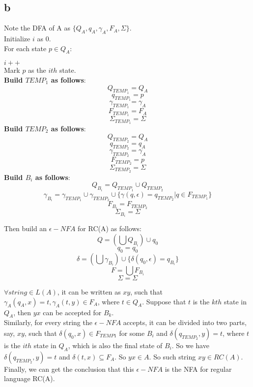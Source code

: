 \documentclass{ctexart}
\begin{document}
\subsection{b}
Note the DFA of A as $\{Q_A, q_A, \gamma_A, F_A, \Sigma\}$.\\
Initialize $i$ as 0.\\
For each state $p \in Q_A$:\\
\begin{adjustwidth}{2cm}{1cm}
	$i++$\\
	Mark $p$ as the $ith$ state.\\
	\textbf{Build $TEMP_1$ as follows}:
	\[Q_{TEMP_1}=Q_A\]
	\[q_{TEMP_1}=p\]
	\[\gamma_{TEMP_1}=\gamma_A\]
	\[F_{TEMP_1}=F_A\]
	\[\Sigma_{TEMP_1}=\Sigma\]
	\textbf{Build $TEMP_2$ as follows}:
	\[Q_{TEMP_2}=Q_A\]
	\[q_{TEMP_2}=q_A\]
	\[\gamma_{TEMP_2}=\gamma_A\]
	\[F_{TEMP_2}=p\]
	\[\Sigma_{TEMP_2}=\Sigma\]
	\textbf{Build $B_i$ as follows}:
	\[Q_{B_i}=Q_{TEMP_1}\cup Q_{TEMP_2}\]
	\[\gamma_{B_i}=\gamma_{TEMP_1}\cup \gamma_{TEMP_2} \cup \{\gamma(q,\epsilon)=q_{TEMP_2}|q\in F_{TEMP_1}\}\]
	\[F_{B_i}=F_{TEMP_2}\]
	\[\Sigma_{B_i}=\Sigma\]
\end{adjustwidth}

Then build an $\epsilon-NFA$ for RC(A) as follows:\\
\[Q=(\bigcup Q_{B_i}) \cup {q_0}\]
\[q_{0}=q_0\]
\[\delta=(\bigcup \gamma_{B_i}) \cup \{\delta(q_0,\epsilon)=q_{B_i}\} \]
\[F=\bigcup F_{B_i}\]
\[\Sigma=\Sigma\]

$\forall string \in L(A)$, it can be written  as $xy$, such that 
$\gamma_A(q_A,x)=t,\gamma_A(t,y)\in F_A$, where $t \in Q_A$. Suppose that 
$t$ is the $kth$ state in $Q_A$, then $yx$ can be accepted for $B_k$.\\
Similarly, for every string the $\epsilon-NFA$ accepts, it can be divided into two parts, say, $xy$, such that $\delta(q_0,x)\in F_{TEMP1}$ for some $B_i$ and 
$\delta(q_{TEMP_2},y)=t$, where $t$ is the $ith$ state in $Q_A$, which is also the final state
of $B_i$. So we have $\delta(q_{TEMP_2},y)=t$ and $\delta(t,x) \subseteq F_A$. So $yx \in A$.
So such string $xy \in RC(A)$.\\

Finally, we can get the conclusion that this $\epsilon-NFA$ is the NFA for regular language RC(A).
\end{document}
